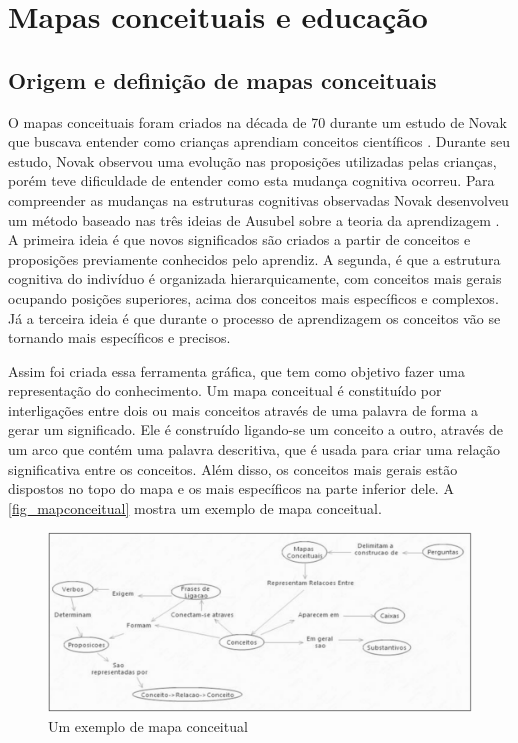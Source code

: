 \documentclass[
	12pt,				%
	openright,			%
	oneside,			%
	a4paper,			%
	english,			%
	french,				%
	spanish,			%
	brazil				%
	]{abntex2}
\begin{document}
\chapter{Mapas conceituais e educação}\label{cap-maps}
\section{Origem e definição de mapas conceituais}
O mapas conceituais foram criados na década de 70 durante um estudo de Novak que buscava entender como crianças aprendiam conceitos científicos \cite{Novak2005}. Durante seu estudo, Novak observou uma evolução nas proposições utilizadas pelas crianças, porém teve dificuldade de entender como esta mudança cognitiva ocorreu. Para compreender as mudanças na estruturas cognitivas observadas Novak desenvolveu um método baseado nas três ideias de Ausubel sobre a teoria da aprendizagem \cite{ausubel1963}. A primeira ideia é que novos significados são criados a partir de conceitos e proposições previamente conhecidos pelo aprendiz. A segunda, é que a estrutura cognitiva do indivíduo é organizada hierarquicamente, com conceitos mais gerais ocupando posições superiores, acima dos conceitos mais específicos e complexos. Já a terceira ideia é que durante o processo de aprendizagem os conceitos vão se tornando mais específicos e precisos.

Assim foi criada essa ferramenta gráfica, que tem como objetivo fazer uma representação do conhecimento. Um mapa conceitual é constituído por interligações entre dois ou mais conceitos através de uma palavra de forma a gerar um significado. Ele é construído ligando-se um conceito a outro, através de um arco que contém uma palavra descritiva, que é usada para criar uma relação significativa entre os conceitos. Além disso, os conceitos mais gerais estão dispostos no topo do mapa e os mais específicos na parte inferior dele. A \autoref{fig_mapconceitual} mostra um exemplo de mapa conceitual.
\begin{figure}[htb]
	\caption{\label{fig_mapconceitual}Um exemplo de mapa conceitual}
	\begin{center}
		\includegraphics[scale=0.3]{mapaconceitual.png}
	\end{center}
\end{figure}
\end{document}
